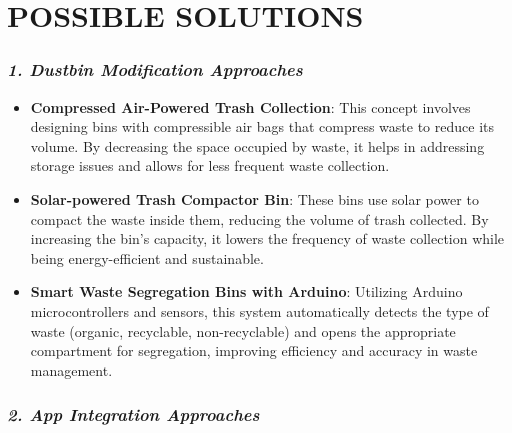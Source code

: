 \documentclass[
]{article}
\begin{document}
\hypertarget{possible-solutions}{%
\section{POSSIBLE SOLUTIONS}\label{possible-solutions}}

\hypertarget{dustbin-modification-approaches}{%
\subsubsection{\texorpdfstring{\emph{\textbf{1}. \textbf{Dustbin
Modification
Approaches}}}{1. Dustbin Modification Approaches}}\label{dustbin-modification-approaches}}

\begin{itemize}
\item
  \textbf{Compressed Air-Powered Trash Collection}: This concept
  involves designing bins with compressible air bags that compress waste
  to reduce its volume. By decreasing the space occupied by waste, it
  helps in addressing storage issues and allows for less frequent waste
  collection.
\item
  \textbf{Solar-powered Trash Compactor Bin}: These bins use solar power
  to compact the waste inside them, reducing the volume of trash
  collected. By increasing the bin's capacity, it lowers the frequency
  of waste collection while being energy-efficient and sustainable.
\item
  \textbf{Smart Waste Segregation Bins with Arduino}: Utilizing Arduino
  microcontrollers and sensors, this system automatically detects the
  type of waste (organic, recyclable, non-recyclable) and opens the
  appropriate compartment for segregation, improving efficiency and
  accuracy in waste management.
\end{itemize}

\hypertarget{app-integration-approaches}{%
\subsubsection{\texorpdfstring{\emph{\textbf{2. App Integration
Approaches}}}{2. App Integration Approaches}}\label{app-integration-approaches}}
\end{document}
